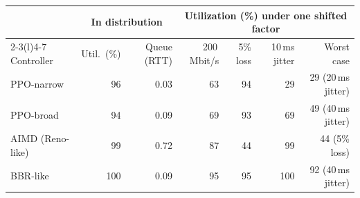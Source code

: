 \begin{tabular}{@{}lrrrrrr@{}}
\toprule
 & \multicolumn{2}{c}{In distribution} & \multicolumn{4}{c}{Utilization (\%) under one shifted factor} \\
\cmidrule(lr){2-3}\cmidrule(l){4-7}
Controller & Util.\ (\%) & Queue (RTT) & 200\,Mbit/s & 5\% loss & 10\,ms jitter & Worst case \\
\midrule
PPO-narrow & 96 & 0.03 & 63 & 94 & 29 & 29 (20\,ms jitter) \\
PPO-broad & 94 & 0.09 & 69 & 93 & 69 & 49 (40\,ms jitter) \\
AIMD (Reno-like) & 99 & 0.72 & 87 & 44 & 99 & 44 (5\% loss) \\
BBR-like & 100 & 0.09 & 95 & 95 & 100 & 92 (40\,ms jitter) \\
\bottomrule
\end{tabular}
